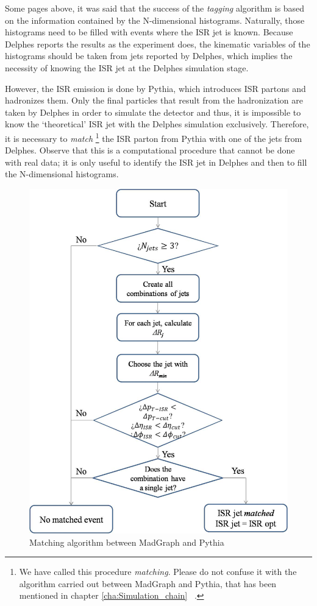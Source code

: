 \documentclass[12pt, oneside]{book}              %
\begin{document}
Some pages above, it was said that the success of the \textit{tagging} algorithm
is based on the information contained by the N-dimensional histograms.
Naturally, those histograms need to be filled with events
where the ISR jet is known. Because Delphes reports the results as the 
experiment does, the kinematic variables of the histograms should be taken
from jets reported by Delphes, which implies the necessity of knowing the ISR
jet at the Delphes simulation stage.

However, the ISR emission is done by Pythia, which introduces ISR partons and
hadronizes them. Only the final particles that result from the hadronization are 
taken by Delphes in order to simulate the detector and thus, it is impossible 
to know the \textquoteleft theoretical' ISR jet with the Delphes simulation exclusively. 
Therefore, it is necessary to \textit{match} \footnote{We have called this procedure 
\textit{matching}. Please do not confuse it with the algorithm carried out
between MadGraph and Pythia, that has been mentioned in chapter \ref{cha:Simulation_chain} ~\cite{matching}.} the ISR parton from Pythia with 
one of the jets from Delphes. Observe that this is a computational procedure 
that cannot be done with real data; it is only useful to identify the ISR jet 
in Delphes and then to fill the N-dimensional histograms.

\begin{figure} [h!]
\centering
\includegraphics[width=0.7\linewidth]{./Imags_Doc/Matching_algorithm}
\caption[Matching algorithm]{Matching algorithm between MadGraph and Pythia}
\label{fig:Matching_algorithm}
\end{figure}
\end{document}
